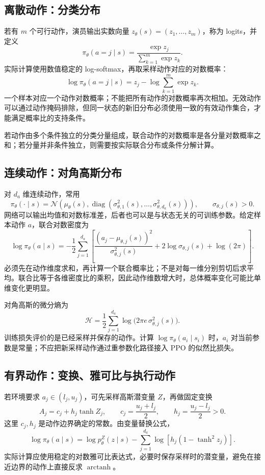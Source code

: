 \documentclass[UTF8,12pt,a4paper,fontset=fandol]{ctexart}
\begin{document}
\subsection{离散动作：分类分布}

若有 $m$ 个可行动作，演员输出实数向量
$z_\theta(s)=(z_1,\ldots,z_m)$，称为 logits，并定义
\[
  \pi_\theta(a=j\mid s)
  =\frac{\exp z_j}{\sum_{k=1}^m\exp z_k}.
\]
实际计算使用数值稳定的 log-softmax，再取采样动作对应的对数概率：
\[
  \log\pi_\theta(a=j\mid s)
  =z_j-\log\sum_{k=1}^m\exp z_k.
\]
一个样本对应一个动作对数概率；不能把所有动作的对数概率再次相加。无效动作可以通过动作掩码排除，但同一状态的新旧分布必须使用一致的有效动作集合，才能满足概率比的支持条件。

若动作由多个条件独立的分类分量组成，联合动作的对数概率是各分量对数概率之和；若分量并非条件独立，则需要按实际联合分布或条件分解计算。

\subsection{连续动作：对角高斯分布}

对 $d_a$ 维连续动作，常用
\[
  \pi_\theta(\cdot\mid s)
  =\mathcal N\!\left(
    \mu_\theta(s),\operatorname{diag}(\sigma_{\theta,1}^2(s),
    \ldots,\sigma_{\theta,d_a}^2(s))\right),
  \qquad \sigma_{\theta,j}(s)>0.
\]
网络可以输出均值和对数标准差，后者也可以是与状态无关的可训练参数。给定样本动作 $a$，联合对数密度为
\begin{equation}
  \log\pi_\theta(a\mid s)
  =-\frac12\sum_{j=1}^{d_a}
    \left[
      \frac{(a_j-\mu_{\theta,j}(s))^2}{\sigma_{\theta,j}^2(s)}
      +2\log\sigma_{\theta,j}(s)+\log(2\pi)
    \right].
  \label{eq:ppo-gaussian-logprob}
\end{equation}
必须先在动作维度求和，再计算一个联合概率比；不是对每一维分别剪切后求平均。联合比等于各维密度比的乘积，因此动作维数增大时，总体概率变化可能比单维变化更明显。

对角高斯的微分熵为
\[
  \mathcal H
  =\frac12\sum_{j=1}^{d_a}
      \log\bigl(2\pi e\,\sigma_{\theta,j}^2(s)\bigr).
\]
训练损失评价的是已经采样并保存的动作。计算
$\log\pi_\theta(a_i\mid s_i)$ 时，$a_i$ 对当前参数是常量；不应把新采样动作通过重参数化路径接入 PPO 的似然比损失。

\subsection{有界动作：变换、雅可比与执行动作}

若环境要求 $a_j\in(l_j,u_j)$，可先采样高斯潜变量 $Z$，再做固定变换
\[
  A_j=c_j+h_j\tanh Z_j,\qquad
  c_j=\frac{u_j+l_j}{2},\qquad h_j=\frac{u_j-l_j}{2}>0.
\]
这里 $c_j,h_j$ 是动作边界确定的常数。由变量替换公式，
\begin{equation}
  \log\pi_\theta(a\mid s)
  =\log p_\theta^Z(z\mid s)
   -\sum_{j=1}^{d_a}
     \log\!\left[h_j(1-\tanh^2z_j)\right].
  \label{eq:ppo-squashed-logprob}
\end{equation}
实际计算应使用稳定的对数雅可比表达式，必要时保存采样时的潜变量，避免在接近边界的动作上直接反求 $\operatorname{arctanh}$。
\end{document}
